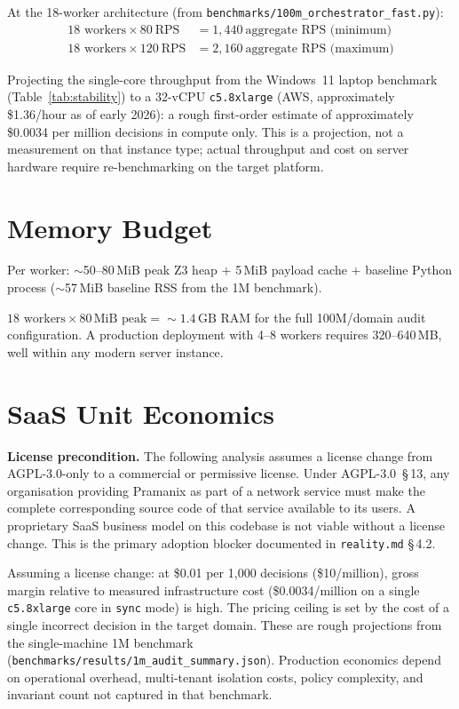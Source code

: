 \documentclass[12pt,a4paper,oneside]{report}
\newcommand{\fname}[1]{\texttt{#1}}          %
\newcommand{\code}[1]{\texttt{#1}}           %
\newcommand{\cfrsec}[1]{\S\,#1}             %
\begin{document}
At the 18-worker architecture (from \fname{benchmarks/100m\_orchestrator\_fast.py}):
\begin{align*}
  18 \text{ workers} \times 80\ \text{RPS}  &= 1{,}440\ \text{aggregate RPS (minimum)} \\
  18 \text{ workers} \times 120\ \text{RPS} &= 2{,}160\ \text{aggregate RPS (maximum)}
\end{align*}

Projecting the single-core throughput from the Windows~11 laptop benchmark
(Table~\ref{tab:stability}) to a 32-vCPU \code{c5.8xlarge} (AWS, approximately
\$1.36/hour as of early 2026): a rough first-order estimate of approximately
\$0.0034 per million decisions in compute only.  This is a projection, not a
measurement on that instance type; actual throughput and cost on server
hardware require re-benchmarking on the target platform.

\section{Memory Budget}

Per worker: $\sim$50--80\,MiB peak Z3 heap $+$ 5\,MiB payload cache $+$
baseline Python process ($\sim$57\,MiB baseline RSS from the 1M benchmark).

$18 \text{ workers} \times 80\,\text{MiB peak} = \sim 1.4\,\text{GB RAM}$
for the full 100M/domain audit configuration. A production deployment with
4--8 workers requires 320--640\,MB, well within any modern server instance.

\section{SaaS Unit Economics}

\textbf{License precondition.}  The following analysis assumes a license
change from AGPL-3.0-only to a commercial or permissive license.  Under
AGPL-3.0~\cfrsec{13}, any organisation providing Pramanix as part of a
network service must make the complete corresponding source code of that
service available to its users.  A proprietary SaaS business model on this
codebase is not viable without a license change.  This is the primary
adoption blocker documented in \fname{reality.md} \cfrsec{4.2}.

Assuming a license change: at \$0.01 per 1,000 decisions (\$10/million),
gross margin relative to measured infrastructure cost (\$0.0034/million on a
single \code{c5.8xlarge} core in \code{sync} mode) is high.  The pricing
ceiling is set by the cost of a single incorrect decision in the target
domain.  These are rough projections from the single-machine 1M benchmark
(\fname{benchmarks/results/1m\_audit\_summary.json}).  Production economics
depend on operational overhead, multi-tenant isolation costs, policy
complexity, and invariant count not captured in that benchmark.
\end{document}
